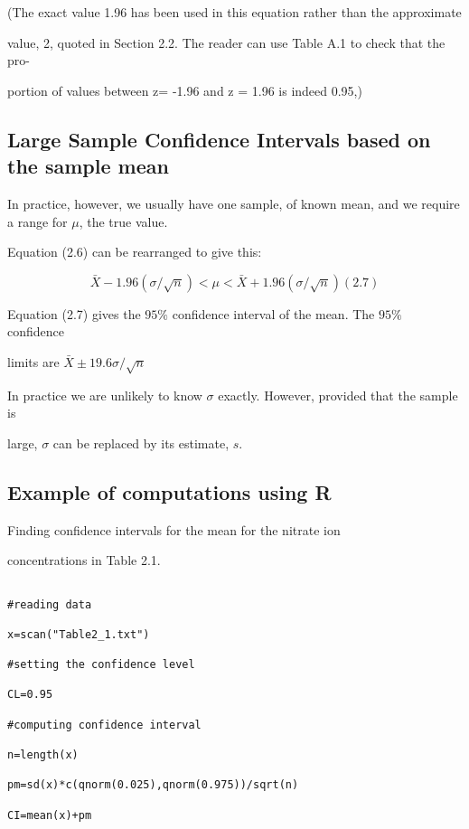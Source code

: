  

(The exact value 1.96 has been used in this equation rather than the approximate

value, 2, quoted in Section 2.2. The reader can use Table A.1 to check that the pro-

portion of values between z= -1.96 and z = 1.96 is indeed 0.95,)

 

\subsection{Large Sample Confidence Intervals based on the sample mean}

 

In practice, however, we usually have one sample, of known mean, and we require a range for $\mu$, the true value.

 

Equation (2.6) can be rearranged to give this:

\[ \bar{X} - 1.96(\sigma/\sqrt{n}) < \mu < \bar{X} + 1.96(\sigma/\sqrt{n}) (2.7)\]

 

Equation (2.7) gives the $95\%$  confidence interval of the mean. The $95\%$  confidence

limits are $\bar{X} \pm 19.6 \sigma/\sqrt{n}$

In practice we are unlikely to know $\sigma$ exactly. However, provided that the sample is

large, $\sigma$ can be replaced by its estimate, $s$.

 



\subsection{Example of computations using R}

Finding confidence intervals for the mean for the nitrate ion

concentrations in Table 2.1.

\begin{verbatim}

#reading data

x=scan("Table2_1.txt")

#setting the confidence level

CL=0.95

#computing confidence interval

n=length(x)

pm=sd(x)*c(qnorm(0.025),qnorm(0.975))/sqrt(n)

CI=mean(x)+pm

\end{verbatim}

